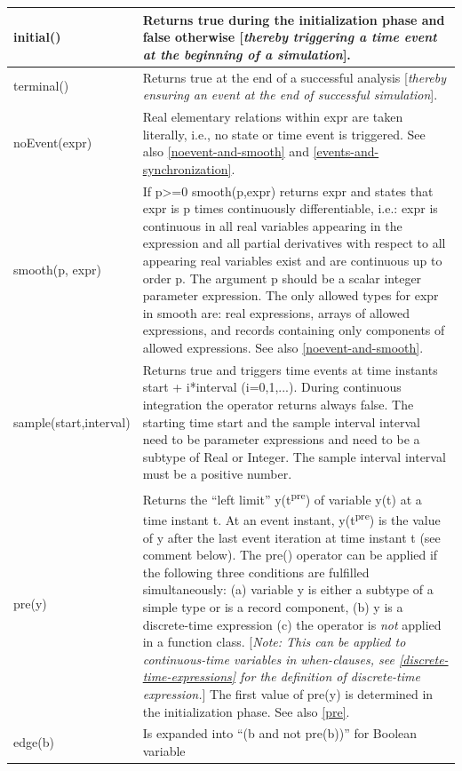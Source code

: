 \documentclass[10pt,a4paper]{report}
\begin{document}
\begin{longtable}{|p{5cm}|p{8cm}|} 
\hline \endhead
initial() & Returns true during the initialization phase and false
otherwise {[}\emph{thereby triggering a time event at the beginning of a
simulation}{]}.\\ \hline
terminal() & Returns true at the end of a successful analysis
{[}\emph{thereby ensuring an event at the end of successful
simulation}{]}.\\ \hline
noEvent(expr) & Real elementary relations within expr are taken
literally, i.e., no state or time event is triggered. See also \ref{noevent-and-smooth} and \ref{events-and-synchronization}.\\ \hline
smooth(p, expr) & If p\textgreater{}=0 smooth(p,expr)
returns expr and states that expr is p times continuously
differentiable, i.e.: expr is continuous in all real variables appearing
in the expression and all partial derivatives with respect to all
appearing real variables exist and are continuous up to order
p. The argument p should be a scalar integer parameter
expression. The only allowed types for expr in smooth are: real
expressions, arrays of allowed expressions, and records containing only
components of allowed expressions. See also \ref{noevent-and-smooth}.\\ \hline
sample(start,interval) & Returns true and triggers time events at time
instants start + i*interval (i=0,1,...). During continuous integration
the operator returns always false. The starting time start and the
sample interval interval need to be parameter expressions and need to be
a subtype of Real or Integer. The sample interval interval must be a
positive number.\\ \hline
pre(y) & Returns the ``left limit'' y(t\textsuperscript{pre}) of
variable y(t) at a time instant t. At an event instant,
y(t\textsuperscript{pre}) is the value of y after the last event
iteration at time instant t (see comment below). The pre() operator can
be applied if the following three conditions are fulfilled
simultaneously: (a) variable y is either a subtype of a simple type or
is a record component, (b) y is a discrete-time expression (c) the
operator is \emph{not} applied in a function class. {[}\emph{Note: This
can be applied to continuous-time variables in when-clauses, see
\ref{discrete-time-expressions} for the definition of discrete-time expression.}{]}
The first value of pre(y) is determined in the initialization phase. See
also \ref{pre}.\\ \hline
edge(b) & Is expanded into ``(b and not pre(b))'' for Boolean variable

\end{longtable}
\end{document}
